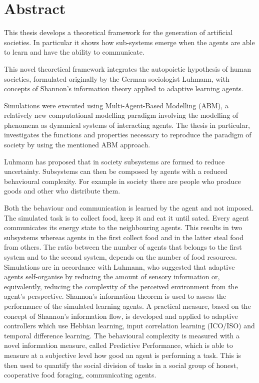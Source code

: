 \documentclass{book}
\begin{document}
\section*{Abstract}
\begin{minipage}[center]{1.0\textwidth}
This thesis develops a theoretical framework for the generation of artificial societies.
In particular it shows how sub-systems emerge when the agents are able to learn and have the ability to communicate.

This novel theoretical framework integrates the autopoietic hypothesis of human
societies, formulated originally by the German sociologist Luhmann, with concepts
of Shannon's information theory applied to adaptive learning agents.

Simulations were executed using Multi-Agent-Based Modelling (ABM), 
a relatively new computational modelling paradigm involving 
the modelling of phenomena as dynamical systems of interacting agents. 
The thesis in particular, investigates the functions and properties necessary to 
reproduce the paradigm of society by using the mentioned ABM approach.

Luhmann has proposed that in society subsystems are formed to reduce
uncertainty. 
Subsystems can then be composed by agents with a reduced behavioural complexity.
For example in society there are people who produce goods and other who
distribute them. 

Both the behaviour and communication is learned by the agent and not imposed.
The simulated task is to collect food, keep it and eat it until
sated. Every agent communicates its energy state to the neighbouring agents.
This results in two subsystems whereas agents in the first collect food and in
the latter steal food from others. The ratio between the number of agents that
belongs to the first system and to the second system, depends on the number of
food resources.
Simulations are in accordance with Luhmann, who 
suggested that adaptive agents self-organise by reducing the amount of sensory 
information or, equivalently, reducing the complexity of the
perceived environment from the agent's perspective. 
Shannon's information theorem is used to assess the performance of the simulated learning
agents.
A practical measure, based on the concept of Shannon's information flow, 
is developed and applied to adaptive controllers which use Hebbian learning, input
correlation learning (ICO/ISO) and
temporal difference learning.
The behavioural complexity 
is measured with a novel information measure, called Predictive Performance, which 
is able to measure at a subjective level how good an agent is performing a task.
This is then used to quantify the social division of tasks in a social group of 
honest, cooperative food foraging, communicating agents.
\end{minipage}
\end{document}
